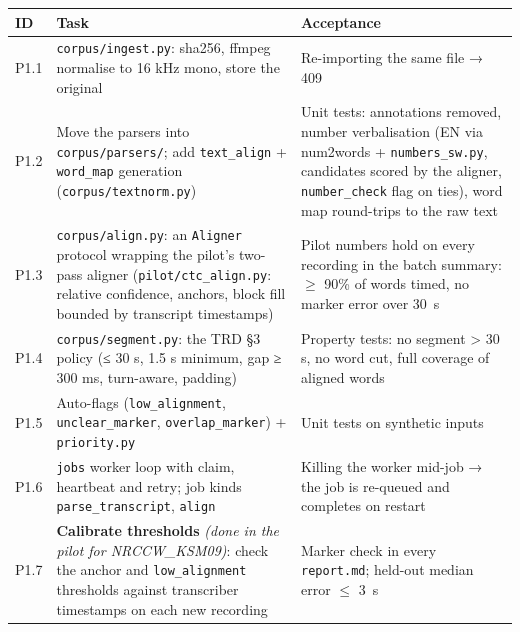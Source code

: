\documentclass[11pt]{article}
\begin{document}
\begin{longtable}[]{@{}>{\raggedright\arraybackslash}p{}>{\raggedright\arraybackslash}p{}>{\raggedright\arraybackslash}p{}@{}}
\toprule\noalign{}
ID & Task & Acceptance \\
\midrule\noalign{}
\endhead
\bottomrule\noalign{}
\endlastfoot
P1.1 & \texttt{corpus/\allowbreak{}ingest.\allowbreak{}py}: sha256, ffmpeg normalise to 16 kHz mono, store the original & Re-importing the same file → 409 \\
P1.2 & Move the parsers into \texttt{corpus/\allowbreak{}parsers/\allowbreak{}}; add \texttt{text\_\allowbreak{}align} + \texttt{word\_\allowbreak{}map} generation (\texttt{corpus/\allowbreak{}textnorm.\allowbreak{}py}) & Unit tests: annotations removed, number verbalisation (EN via num2words + \texttt{numbers\_\allowbreak{}sw.\allowbreak{}py}, candidates scored by the aligner, \texttt{number\_\allowbreak{}check} flag on ties), word map round-trips to the raw text \\
P1.3 & \texttt{corpus/\allowbreak{}align.\allowbreak{}py}: an \texttt{Aligner} protocol wrapping the pilot's two-pass aligner (\texttt{pilot/\allowbreak{}ctc\_\allowbreak{}align.\allowbreak{}py}: relative confidence, anchors, block fill bounded by transcript timestamps) & Pilot numbers hold on every recording in the batch summary: $\ge$ 90\% of words timed, no marker error over 30~s \\
P1.4 & \texttt{corpus/\allowbreak{}segment.\allowbreak{}py}: the TRD §3 policy (≤ 30 s, 1.5 s minimum, gap ≥ 300 ms, turn-aware, padding) & Property tests: no segment \textgreater{} 30 s, no word cut, full coverage of aligned words \\
P1.5 & Auto-flags (\texttt{low\_\allowbreak{}alignment}, \texttt{unclear\_\allowbreak{}marker}, \texttt{overlap\_\allowbreak{}marker}) + \texttt{priority.\allowbreak{}py} & Unit tests on synthetic inputs \\
P1.6 & \texttt{jobs} worker loop with claim, heartbeat and retry; job kinds \texttt{parse\_\allowbreak{}transcript}, \texttt{align} & Killing the worker mid-job → the job is re-queued and completes on restart \\
P1.7 & \textbf{Calibrate thresholds} \emph{(done in the pilot for NRCCW\_KSM09)}: check the anchor and \texttt{low\_\allowbreak{}alignment} thresholds against transcriber timestamps on each new recording & Marker check in every \texttt{report.md}; held-out median error $\le$ 3~s \\
\end{longtable}
\end{document}
